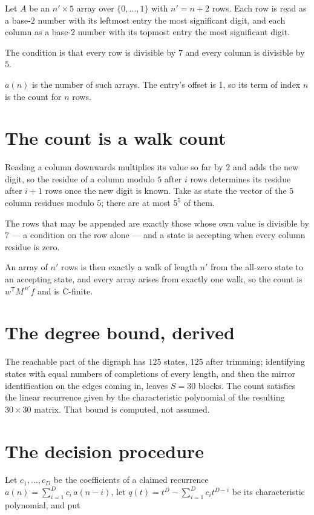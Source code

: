 \documentclass[11pt]{article}
\theoremstyle{definition}
\begin{document}
Let $A$ be an $n' \times 5$ array over $\{0,\dots,1\}$ with $n' = n + 2$ rows. Each row is read as a base-$2$ number with its leftmost entry the most significant digit, and each column as a base-$2$ number with its topmost entry the most significant digit.

The condition is that every row is divisible by $7$ and every column is divisible by $5$.

$a(n)$ is the number of such arrays. The entry's offset is 1, so its term of index $n$ is the count for $n$ rows.

\section{The count is a walk count}

Reading a column downwards multiplies its value so far by $2$ and adds the new digit, so the residue of a column modulo $5$ after $i$ rows determines its residue after $i+1$ rows once the new digit is known. Take as state the vector of the $5$ column residues modulo $5$; there are at most $5^{5}$ of them.

The rows that may be appended are exactly those whose own value is divisible by $7$ --- a condition on the row alone --- and a state is accepting when every column residue is zero.

An array of $n'$ rows is then exactly a walk of length $n'$ from the all-zero state to an accepting state, and every array arises from exactly one walk, so the count is $w^{\mathsf T}M^{\,n'}f$ and is C-finite.

\section{The degree bound, derived}

The reachable part of the digraph has $125$ states, $125$ after trimming; identifying states with equal numbers of completions of every length, and then the mirror identification on the edges coming in, leaves $S = 30$ blocks. The count satisfies the linear recurrence given by the characteristic polynomial of the resulting $30\times30$ matrix. That bound is computed, not assumed.

\section{The decision procedure}

Let $c_1,\dots,c_D$ be the coefficients of a claimed recurrence $a(n) = \sum_{i=1}^{D} c_i\,a(n-i)$, let $q(t) = t^{D} - \sum_{i=1}^{D} c_i t^{D-i}$ be its characteristic polynomial, and put
\end{document}
